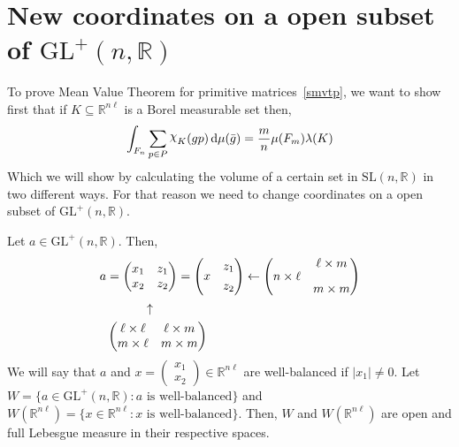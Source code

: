 \documentclass[11pt]{article}
\theoremstyle{definition}
\newcommand{\mychi}{\raisebox{2pt}{$\chi$}}
\begin{document}
\section{New coordinates on a open subset of $\mathrm{GL}^+(n, \mathbb{R})$}\label{secn1.6}
To prove Mean Value Theorem for primitive matrices~\ref{smvtp}, we want to show first that if $K \subseteq \mathbb{R}^{n \ell }$ is a Borel measurable set then,
\[
    \int_{F_n} \displaystyle\sum_{p \in P} \mychi _K (gp) \, \mathrm{d} \mu  (\bar{g}) = \frac{m}{n} \mu (F_m) \lambda (K)
\]
Which we will show by calculating the volume of a certain set in $\mathrm{SL}(n,\mathbb{R}	)$ in two different ways.
For that reason we need to change coordinates on a open subset of $  \mathrm{GL}^+(n, \mathbb{R})$.

Let $a \in  \mathrm{GL}^+(n, \mathbb{R}) $. Then,
\begin{align*}
    a &=
    \begin{pmatrix}
        x_1 & z_1  \\
        x_2 & z_2
    \end{pmatrix}
    =
    \begin{pmatrix}
        & z_1  \\
        \raisebox{.8em}{$x$} & z_2
    \end{pmatrix}
    \leftarrow
    \begin{pmatrix}
        & \ell \times m  \\
        \raisebox{1em}{$n \times \ell$} & m \times m
    \end{pmatrix}\\
    & \ \ \ \ \ \ \ \ \ \uparrow \\
    &
    \begin{pmatrix}
        \ell \times \ell & \ell \times m  \\
        m \times \ell    & m \times m
    \end{pmatrix}
\end{align*}
We will say that $a$ and $x =
\begin{pmatrix}
    x_1 \\
    x_2
\end{pmatrix} \in \mathbb{R}^{n\ell }$ are well-balanced if $|x_1| \neq 0$.
Let $W= \{a \in \mathrm{GL}^+(n, \mathbb{R}): a\text{ is well-balanced}\}$ and $W(\mathbb{R}^{n\ell }) = \{x \in \mathbb{R}^{n\ell } : x \text{ is well-balanced}\}$.
Then, $W$ and $W(\mathbb{R}^{n\ell })$ are open and full Lebesgue measure in their respective spaces.
\end{document}
